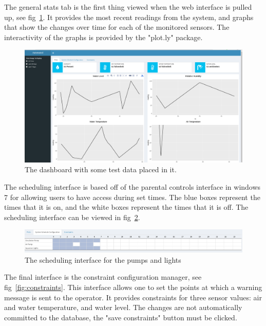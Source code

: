 \documentclass[american,12pt]{article}
\begin{document}
The general stats tab is the first thing viewed when the web interface is
pulled up, see fig~\ref{fig:data dashboard}. It provides the most recent 
readings from the system, and
graphs that show the changes over time for each of the monitored sensors.
The interactivity of the graphs is provided by the "plot.ly" package.

\begin{figure}[h]
	\includegraphics[width=\linewidth]{imgs/WebappDashboard}
	\caption{The dashboard with some test data placed in it.}
	\label{fig:data dashboard}
\end{figure}

The scheduling interface is based off of the parental controls interface
in windows 7 for allowing users to have access during set times. The blue
boxes represent the times that it is on, and the white boxes represent the
times that it is off. The scheduling interface can be viewed in
fig~\ref{fig:schedular}.

\begin{figure}[h]
	\includegraphics[width=\linewidth]{imgs/sched}
	\caption{The scheduling interface for the pumps and lights}
	\label{fig:schedular}
\end{figure}

The final interface is the constraint configuration manager,
see fig~\ref{fig:constraints}. 
This interface allows
one to set the points at which a warning message is sent to the operator.
It provides constraints for three sensor values: air and water temperature,
and water level. The changes are not automatically committed to the database,
the "save constraints" button must be clicked.
\end{document}
